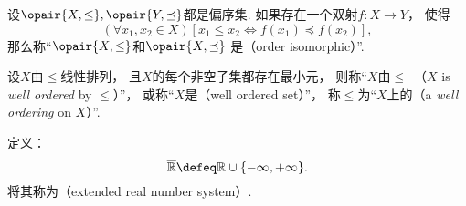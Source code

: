 \begin{definition}
设\(\opair{X,\leq},\opair{Y,\preceq}\)都是偏序集.
如果存在一个双射\(f\colon X \to Y\)，
使得\[
	(\forall x_1,x_2 \in X)
	[
		x_1 \leq x_2
		\iff
		f(x_1) \preceq f(x_2)
	],
\]
那么称“\(\opair{X,\leq}\)和\(\opair{X,\preceq}\)
是（order isomorphic）”.
\end{definition}

\begin{definition}
设\(X\)由\(\leq\)线性排列，
且\(X\)的每个非空子集都存在最小元，
则称“\(X\)由\(\leq\)~（\(X\) is \emph{well ordered} by \(\leq\)）”，
或称“\(X\)是（well ordered set）”，
称\(\leq\)为“\(X\)上的（a \emph{well ordering} on \(X\)）”.
\end{definition}







\begin{definition}
定义：\[
	\overline{\mathbb{R}}
	\defeq
	\mathbb{R}
	\cup
	\{-\infty,+\infty\}.
\]
将其称为（extended real number system）.
\end{definition}
